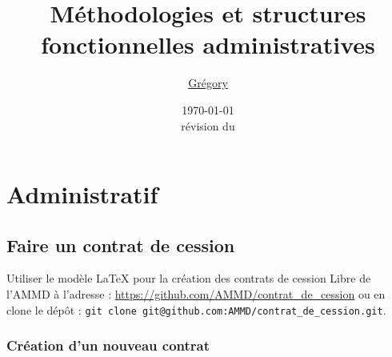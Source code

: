 \documentclass[a4paper]{article}
\title{Méthodologies et structures fonctionnelles administratives}
\author{\href{mailto:tresorier@ammd.net}{Grégory \bsc{David}}}
\date{\today\\ {\scriptsize r\'evision \gitAbbrevHash{} du \gitAuthorIsoDate}}
\begin{document}

\maketitle
\tableofcontents{}
\listoftables{}
\listoffigures{}
\newpage
\section{Administratif}
\label{sec:Tresorerie}

\subsection{Faire un contrat de cession}
\label{sec:FaireContratCession}
Utiliser le modèle \LaTeX{} pour la création des contrats de cession Libre de l'AMMD à l'adresse : \url{https://github.com/AMMD/contrat_de_cession} ou en clone le dépôt : \lstinline{git clone git@github.com:AMMD/contrat_de_cession.git}.


\subsubsection{Création d'un nouveau contrat}
\label{sec:CreationNouveauContratCession}
\end{document}
